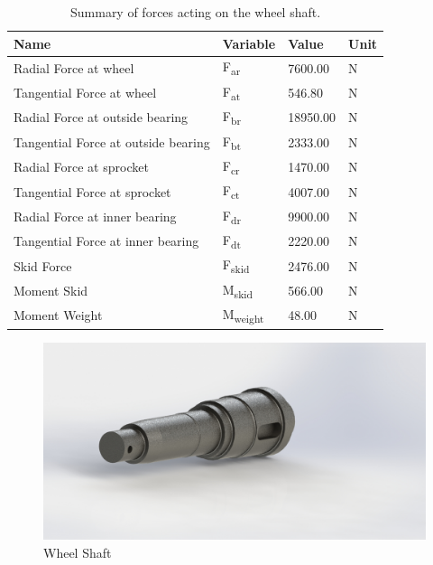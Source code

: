 \begin{table}[H]
	\centering
	\caption{Summary of forces acting on the wheel shaft.}
	\begin{tabular}{| llll |} \hline
		Name & Variable & Value & Unit \\ \hline
		Radial Force at wheel & F\textsubscript{ar} & 7600.00 & N \\
		Tangential Force at wheel & F\textsubscript{at} & 546.80 & N \\
		Radial Force at outside bearing & F\textsubscript{br} & 18950.00 & N \\
		Tangential Force at outside bearing & F\textsubscript{bt} & 2333.00 & N \\
		Radial Force at sprocket & F\textsubscript{cr} & 1470.00 & N \\
		Tangential Force at sprocket & F\textsubscript{ct} & 4007.00 & N \\
		Radial Force at inner bearing & F\textsubscript{dr} & 9900.00 & N \\
		Tangential Force at inner bearing & F\textsubscript{dt} & 2220.00 & N \\
		Skid Force & F\textsubscript{skid} & 2476.00 & N \\
		Moment Skid & M\textsubscript{skid} & 566.00 & N \\
		Moment Weight & M\textsubscript{weight} & 48.00 & N \\ \hline
	\end{tabular}
	\label{tab:shaft_calc}
\end{table}

\begin{figure}[h]\centering
	\includegraphics[width=.7\linewidth]{dom/shaft_iso_rndr.jpg}
	\caption{Wheel Shaft}
	\label{fig:wheel_shaft}
\end{figure}

